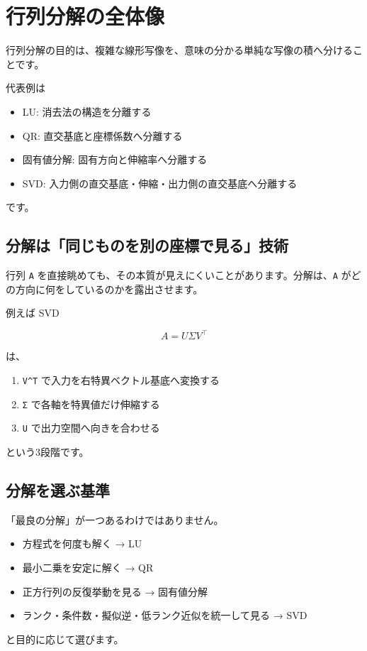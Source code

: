 \documentclass[
  11pt,
  a4paper,
]{ltjsarticle}
\author{}
\date{}
\providecommand{\tightlist}{%
  \setlength{\itemsep}{0pt}\setlength{\parskip}{0pt}}
\begin{document}
\hypertarget{ux884cux5217ux5206ux89e3ux306eux5168ux4f53ux50cf}{%
\section{行列分解の全体像}\label{ux884cux5217ux5206ux89e3ux306eux5168ux4f53ux50cf}}

行列分解の目的は、複雑な線形写像を、意味の分かる単純な写像の積へ分けることです。

代表例は

\begin{itemize}
\tightlist
\item
  LU: 消去法の構造を分離する
\item
  QR: 直交基底と座標係数へ分離する
\item
  固有値分解: 固有方向と伸縮率へ分離する
\item
  SVD: 入力側の直交基底・伸縮・出力側の直交基底へ分離する
\end{itemize}

です。

\hypertarget{ux5206ux89e3ux306fux540cux3058ux3082ux306eux3092ux5225ux306eux5ea7ux6a19ux3067ux898bux308bux6280ux8853}{%
\subsection{分解は「同じものを別の座標で見る」技術}\label{ux5206ux89e3ux306fux540cux3058ux3082ux306eux3092ux5225ux306eux5ea7ux6a19ux3067ux898bux308bux6280ux8853}}

行列 \texttt{A}
を直接眺めても、その本質が見えにくいことがあります。分解は、\texttt{A}
がどの方向に何をしているのかを露出させます。

例えば SVD

\[
A=U\Sigma V^\top
\]

は、

\begin{enumerate}
\def\labelenumi{\arabic{enumi}.}
\tightlist
\item
  \texttt{V\^{}T} で入力を右特異ベクトル基底へ変換する
\item
  \texttt{Σ} で各軸を特異値だけ伸縮する
\item
  \texttt{U} で出力空間へ向きを合わせる
\end{enumerate}

という3段階です。

\hypertarget{ux5206ux89e3ux3092ux9078ux3076ux57faux6e96}{%
\subsection{分解を選ぶ基準}\label{ux5206ux89e3ux3092ux9078ux3076ux57faux6e96}}

「最良の分解」が一つあるわけではありません。

\begin{itemize}
\tightlist
\item
  方程式を何度も解く → LU
\item
  最小二乗を安定に解く → QR
\item
  正方行列の反復挙動を見る → 固有値分解
\item
  ランク・条件数・擬似逆・低ランク近似を統一して見る → SVD
\end{itemize}

と目的に応じて選びます。
\end{document}
